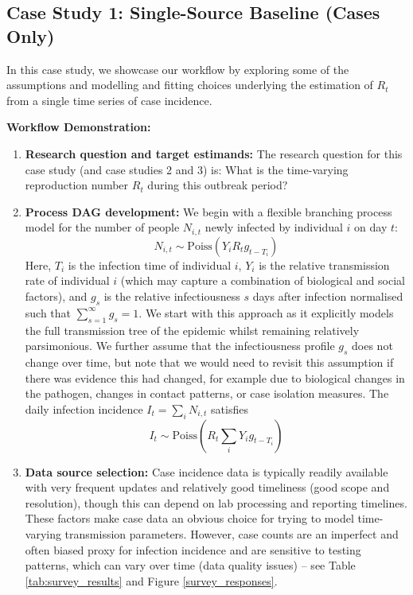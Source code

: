 \documentclass{article}
\begin{document}
\subsection{Case Study 1: Single-Source Baseline (Cases Only)}


In this case study, we showcase our workflow by exploring some of the assumptions and modelling and fitting choices underlying the estimation of $R_t$ from a single time series of case incidence.

\textbf{Workflow Demonstration:}
\begin{enumerate}
    \item \textbf{Research question and target estimands:} The research question for this case study (and case studies 2 and 3) is: What is the time-varying reproduction number $R_t$ during this outbreak period?

    \item \textbf{Process DAG development:} We begin with a flexible branching process model for the number of people $N_{i,t}$ newly infected by individual $i$ on day $t$:
    \begin{equation} \label{eq:individual_level}
         N_{i,t} \sim \mathrm{Poiss} \left( Y_i R_t g_{t-T_i} \right)
    \end{equation} 
    Here, $T_i$ is the infection time of individual $i$, $Y_i$ is the relative transmission rate of individual $i$ (which may capture a combination of biological and social factors), and $g_s$ is the relative infectiousness $s$ days after infection normalised such that $\sum_{s=1}^\infty g_s=1$. We start with this approach as it explicitly models the full transmission tree of the epidemic whilst remaining relatively parsimonious. We further assume that the infectiousness profile $g_s$ does not change over time, but note that we would need to revisit this assumption if there was evidence this had changed, for example due to biological changes in the pathogen, changes in contact patterns, or case isolation measures. The daily infection incidence $I_t=\sum_i N_{i,t}$ satisfies
    \begin{equation} \label{eq:It_with_hetergoeneity}
        I_t \sim \mathrm{Poiss}\left( R_t \sum_i Y_i g_{t-T_i} \right)
    \end{equation}


\item \textbf{Data source selection:} Case incidence data is typically readily available with very frequent updates and relatively good timeliness (good scope and resolution), though this can depend on lab processing and reporting timelines. These factors make case data an obvious choice for trying to model time-varying transmission parameters. However, case counts are an imperfect and often biased proxy for infection incidence and are sensitive to testing patterns, which can vary over time (data quality issues) -- see Table \ref{tab:survey_results} and Figure \ref{survey_responses}. 



\end{enumerate}
\end{document}

